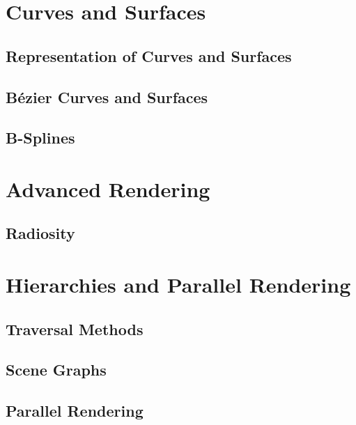 \documentclass[11pt,a4paper]{article}
\begin{document}
\section{Curves and Surfaces}
	\subsection{Representation of Curves and Surfaces}
	\subsection{Bézier Curves and Surfaces}
	\subsection{B-Splines}
\section{Advanced Rendering}
	\subsection{Radiosity}
\section{Hierarchies and Parallel Rendering}
	 \subsection{Traversal Methods}
	 \subsection{Scene Graphs}
	 \subsection{Parallel Rendering}
\end{document}
